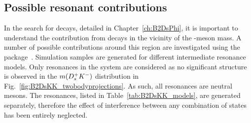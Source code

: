 

\subsection{Possible resonant contributions}
\label{sec:B2DsKK_possible_res}

In the search for \decay{\Bp}{\Dsp\phiz} decays, detailed in Chapter~\ref{ch:B2DsPhi}, it is important to understand the contribution from \decay{\Bp}{\Dsp\Kp\Km} decays in the vicinity of the \phiz-meson mass.
A number of possible contributions around this region are investigated using the \laurapp package~\cite{1711.09854}. Simulation samples are generated for different intermediate resonance models.
Only resonances in the \Kp\Km system are considered as no significant structure is observed in the $m({{D}^+_{s}}{{K}^-})$ distribution in Fig.~\ref{fig:B2DsKK_twobodyprojections}. As such, all resonances are neutral mesons. The resonances, listed in Table~\ref{tab:B2DsKK_models}, are generated separately, therefore the effect of interference between any combination of states has been entirely neglected.    



